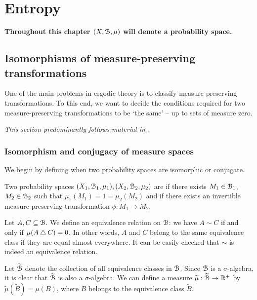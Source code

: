 \chapter{Entropy}
\begin{mdframed}[linewidth=2,leftmargin=108,rightmargin=108,skipbelow=30]
	\textbf{Throughout this chapter $(X, \mathcal{B}, \mu)$ will denote a probability space.}
\end{mdframed}

\section{Isomorphisms of measure-preserving transformations}\label{sec:isos-of-mpts}
One of the main problems in ergodic theory is to classify measure-preserving transformations. To this end, we want to decide the conditions required for two measure-preserving transformations to be `the same' -- up to sets of measure zero.

\emph{This section predominantly follows material in \cite[Chapter 2]{walters:intro-to-ergodic-theory}.}

\subsection{Isomorphism and conjugacy of measure spaces}

We begin by defining when two probability spaces are isomorphic or conjugate.

\begin{definition}
	Two probability spaces $(X_1, \mathcal{B}_1, \mu_1), (X_2, \mathcal{B}_2, \mu_2)$ are  if there exists $M_1 \in \mathcal{B}_1$, $M_2 \in \mathcal{B}_2$ such that $\mu_1(M_1) = 1 = \mu_2(M_2)$ and if there exists an invertible measure-preserving transformation $\phi: M_1 \to M_2$.
\end{definition}

Let $A, C \subseteq \mathcal{B}$. We define an equivalence relation on $\mathcal{B}$: we have $A \sim C$ if and only if $\mu(A \bigtriangleup C) = 0$. In other words, $A$ and $C$ belong to the same equivalence class if they are equal almost everywhere. It can be easily checked that $\sim$ is indeed an equivalence relation.

Let $\widetilde{\mathcal{B}}$ denote the collection of all equivalence classes in $\mathcal{B}$. Since $\mathcal{B}$ is a $\sigma$-algebra, it is clear that $\widetilde{\mathcal{B}}$ is also a $\sigma$-algebra. We can define a measure $\widetilde{\mu} : \widetilde{\mathcal{B}} \to \mathbb{R}^+$ by $\tilde{\mu}(\tilde{B}) = \mu(B)$, where $B$ belongs to the equivalence class $\tilde{B}$.

